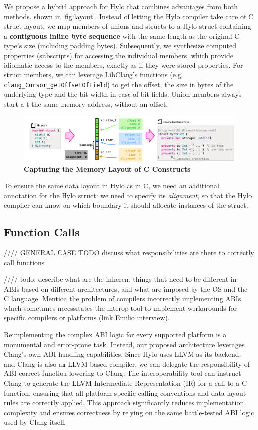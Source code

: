 We propose a hybrid approach for Hylo that combines advantages from both methods, shown in \autoref{fig:layout}. Instead of letting the Hylo compiler take care of C struct layout, we map members of unions and structs to a Hylo struct containing a \textbf{contiguous inline byte sequence} with the same length as the original C type's size (including padding bytes). Subsequently, we synthesize computed properties (subscripts) for accessing the individual members, which provide idiomatic access to the members, exactly as if they were stored properties. For struct members, we can leverage LibClang's functions (e.g. \texttt{clang\_Cursor\_getOffsetOfField}) to get the offset, the size in bytes of the underlying type and the bit-width in case of bit-fields. Union members always start a  t the same memory address, without an offset\cite{c23-struct-and-union-specifiers}.
\begin{figure}
    \includegraphics[width=1\textwidth]{attachments/layout.pdf}
    \caption{\textbf{Capturing the Memory Layout of C Constructs}}
    \label{fig:layout}
\end{figure}
To ensure the same data layout in Hylo as in C, we need an additional annotation for the Hylo struct: we need to specify its \textit{alignment}, so that the Hylo compiler can know on which boundary it should allocate instances of the struct.

\subsection{Function Calls}
//// GENERAL CASE
TODO discuss what responsibilities are there to correctly call functions 

//// todo: describe what are the inherent things that need to be different in ABIs based on different architectures, and what are imposed by the OS and the C language. Mention the problem of compilers incorrectly implementing ABIs which sometimes necessitates the interop tool to implement workarounds for specific compilers or platforms (link Emilio interview).

Reimplementing the complex ABI logic for every supported platform is a monumental and error-prone task. Instead, our proposed architecture leverages Clang's own ABI handling capabilities. Since Hylo uses LLVM as its backend, and Clang is also an LLVM-based compiler, we can delegate the responsibility of ABI-correct function lowering to Clang. The interoperability tool can instruct Clang to generate the LLVM Intermediate Representation (IR) for a call to a C function, ensuring that all platform-specific calling conventions and data layout rules are correctly applied. This approach significantly reduces implementation complexity and ensures correctness by relying on the same battle-tested ABI logic used by Clang itself.

